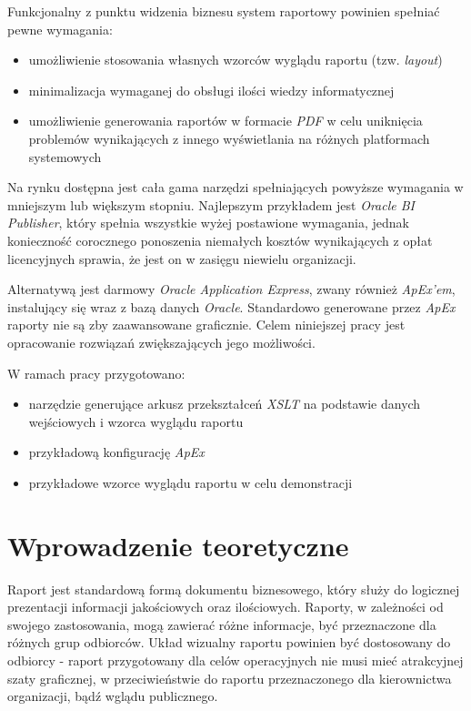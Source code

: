 \documentclass[11pt,a4paper]{article}
\begin{document}
Funkcjonalny z punktu widzenia biznesu system raportowy powinien spełniać pewne wymagania:
\begin{itemize}
	\item umożliwienie stosowania własnych wzorców wyglądu raportu (tzw. \emph{layout})
	\item minimalizacja wymaganej do obsługi ilości wiedzy informatycznej 
	\item umożliwienie generowania raportów w formacie \emph{PDF} w celu uniknięcia problemów wynikających z innego wyświetlania na różnych platformach systemowych
\end{itemize}

Na rynku dostępna jest cała gama narzędzi spełniających powyższe wymagania w mniejszym lub większym stopniu. Najlepszym przykładem jest \emph{Oracle BI Publisher}, który spełnia wszystkie wyżej postawione wymagania, jednak konieczność corocznego ponoszenia niemałych kosztów wynikających z opłat licencyjnych sprawia, że jest on w zasięgu niewielu organizacji.

Alternatywą jest darmowy \emph{Oracle Application Express}, zwany również \emph{ApEx'em}, instalujący się wraz z bazą danych \emph{Oracle}. Standardowo generowane przez \emph{ApEx} raporty nie są zby zaawansowane graficznie. Celem niniejszej pracy jest opracowanie rozwiązań zwiększających jego możliwości.

W ramach pracy przygotowano:
\begin{itemize}
	\item narzędzie generujące arkusz przekształceń \emph{XSLT} na podstawie danych wejściowych i wzorca wyglądu raportu
	\item przykładową konfigurację \emph{ApEx}
	\item przykładowe wzorce wyglądu raportu w celu demonstracji
\end{itemize}


\newpage

\section{Wprowadzenie teoretyczne} \label{sec:teoria}
Raport jest standardową formą dokumentu biznesowego, który służy do logicznej prezentacji informacji jakościowych oraz ilościowych. Raporty, w zależności od swojego zastosowania, mogą zawierać różne informacje, być przeznaczone dla różnych grup odbiorców. Układ wizualny raportu powinien być dostosowany do odbiorcy - raport przygotowany dla celów operacyjnych nie musi mieć atrakcyjnej szaty graficznej, w przeciwieństwie do raportu przeznaczonego dla kierownictwa organizacji, bądź wglądu publicznego. 
\end{document}
